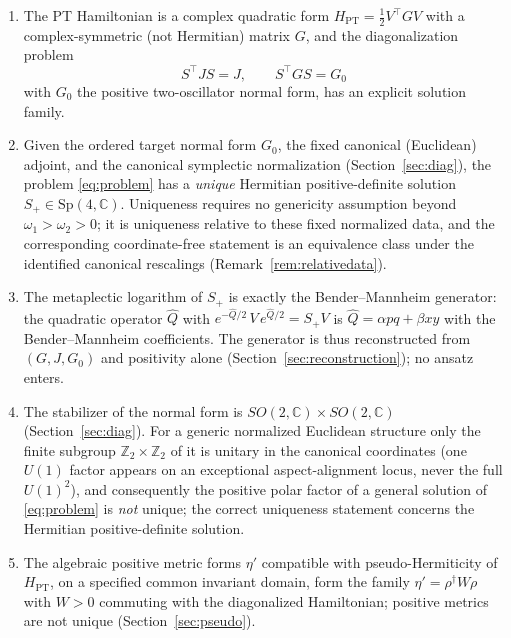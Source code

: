 \documentclass[11pt]{article}
\theoremstyle{definition}
\theoremstyle{remark}
\newcommand{\C}{\mathbb{C}}
\newcommand{\Z}{\mathbb{Z}}
\newcommand{\w}{\omega}
\newcommand{\Sp}{\mathrm{Sp}}
\newcommand{\dg}{\dagger}
\begin{document}
\begin{enumerate}
\item The PT Hamiltonian is a complex quadratic form
$H_{\mathrm{PT}}=\tfrac12 V^{\top}GV$ with a complex-symmetric (not Hermitian)
matrix $G$, and the diagonalization problem
\begin{equation}\label{eq:problem}
S^{\top}JS=J,\qquad S^{\top}GS=G_0
\end{equation}
with $G_0$ the positive two-oscillator normal form, has an explicit solution
family.

\item Given the ordered target normal form $G_0$, the fixed canonical
(Euclidean) adjoint, and the canonical symplectic normalization
(Section~\ref{sec:diag}), the problem \eqref{eq:problem} has a
\emph{unique} Hermitian positive-definite
solution $S_+\in \Sp(4,\C)$.  Uniqueness requires no genericity assumption
beyond $\w_1>\w_2>0$; it is uniqueness relative to these fixed normalized
data, and the corresponding coordinate-free statement is an equivalence
class under the identified canonical rescalings
(Remark~\ref{rem:relativedata}).

\item The metaplectic logarithm of $S_+$ is exactly the Bender--Mannheim
generator: the quadratic operator $\widehat Q$ with
$e^{-\widehat Q/2}\,V\,e^{\widehat Q/2}=S_+V$ is
$\widehat Q=\alpha pq+\beta xy$ with the Bender--Mannheim coefficients.  The
generator is thus reconstructed from $(G,J,G_0)$ and positivity alone
(Section~\ref{sec:reconstruction}); no ansatz enters.

\item The stabilizer of the normal form is $SO(2,\C)\times SO(2,\C)$
(Section~\ref{sec:diag}).  For a generic normalized Euclidean structure
only the finite subgroup $\Z_2\times\Z_2$ of it is unitary in the
canonical coordinates (one $U(1)$ factor appears on an exceptional
aspect-alignment locus, never the full $U(1)^2$), and consequently the
positive polar factor of a
general solution of \eqref{eq:problem} is \emph{not} unique; the correct
uniqueness statement concerns the Hermitian positive-definite solution.

\item The algebraic positive metric forms $\eta'$ compatible with
pseudo-Hermiticity of $H_{\mathrm{PT}}$, on a specified common invariant
domain, form the family
$\eta'=\rho^{\dg}W\rho$ with $W>0$ commuting with the diagonalized
Hamiltonian; positive metrics are not unique
(Section~\ref{sec:pseudo}).


\end{enumerate}
\end{document}
